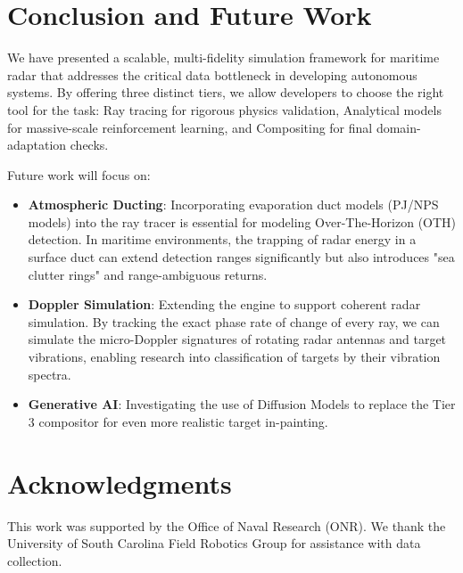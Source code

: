 \documentclass[conf]{new-aiaa}
\begin{document}
\section{Conclusion and Future Work}
We have presented a scalable, multi-fidelity simulation framework for maritime radar that addresses the critical data bottleneck in developing autonomous systems. By offering three distinct tiers, we allow developers to choose the right tool for the task: Ray tracing for rigorous physics validation, Analytical models for massive-scale reinforcement learning, and Compositing for final domain-adaptation checks.

Future work will focus on:
\begin{itemize}
    \item \textbf{Atmospheric Ducting}: Incorporating evaporation duct models (PJ/NPS models) into the ray tracer is essential for modeling Over-The-Horizon (OTH) detection. In maritime environments, the trapping of radar energy in a surface duct can extend detection ranges significantly but also introduces "sea clutter rings" and range-ambiguous returns.
    \item \textbf{Doppler Simulation}: Extending the engine to support coherent radar simulation. By tracking the exact phase rate of change of every ray, we can simulate the micro-Doppler signatures of rotating radar antennas and target vibrations, enabling research into classification of targets by their vibration spectra.
    \item \textbf{Generative AI}: Investigating the use of Diffusion Models to replace the Tier 3 compositor for even more realistic target in-painting.
\end{itemize}

\section*{Acknowledgments}
This work was supported by the Office of Naval Research (ONR). We thank the University of South Carolina Field Robotics Group for assistance with data collection.
\end{document}
